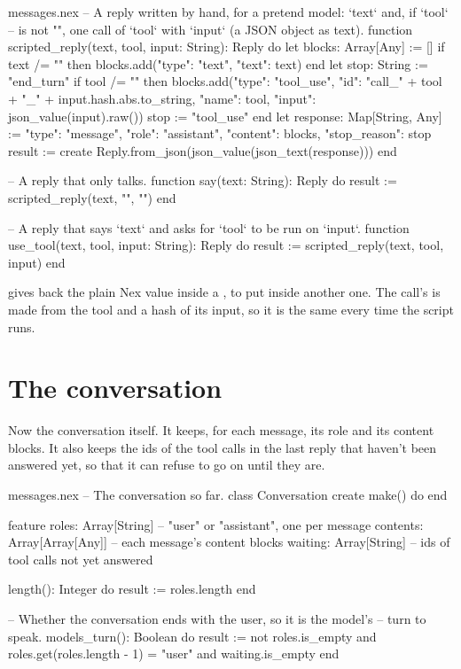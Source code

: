 \begin{append}{messages.nex}
-- A reply written by hand, for a pretend model: `text` and, if `tool`
-- is not "", one call of `tool` with `input` (a JSON object as text).
function scripted_reply(text, tool, input: String): Reply do
  let blocks: Array[Any] := []
  if text /= "" then
    blocks.add({"type": "text", "text": text})
  end
  let stop: String := "end_turn"
  if tool /= "" then
    blocks.add({"type": "tool_use", "id": "call_" + tool + "_" + input.hash.abs.to_string,
      "name": tool, "input": json_value(input).raw()})
    stop := "tool_use"
  end
  let response: Map[String, Any] := {"type": "message", "role": "assistant",
    "content": blocks, "stop_reason": stop}
  result := create Reply.from_json(json_value(json_text(response)))
end

-- A reply that only talks.
function say(text: String): Reply do
  result := scripted_reply(text, "", "")
end

-- A reply that says `text` and asks for `tool` to be run on `input`.
function use_tool(text, tool, input: String): Reply do
  result := scripted_reply(text, tool, input)
end
\end{append}

 gives back the plain Nex value inside a , to
put inside another one. The call's  is made from the tool and a
hash of its input, so it is the same every time the script runs.

\section{The conversation}

Now the conversation itself. It keeps, for each message, its role and its
content blocks. It also keeps the ids of the tool calls in the last reply
that haven't been answered yet, so that it can refuse to go on until they
are.

\begin{append}{messages.nex}
-- The conversation so far.
class Conversation
create
  make() do
  end

feature
  roles: Array[String]           -- "user" or "assistant", one per message
  contents: Array[Array[Any]]    -- each message's content blocks
  waiting: Array[String]         -- ids of tool calls not yet answered

  length(): Integer do
    result := roles.length
  end

  -- Whether the conversation ends with the user, so it is the model's
  -- turn to speak.
  models_turn(): Boolean do
    result := not roles.is_empty and roles.get(roles.length - 1) = "user"
      and waiting.is_empty
  end
\end{append}

